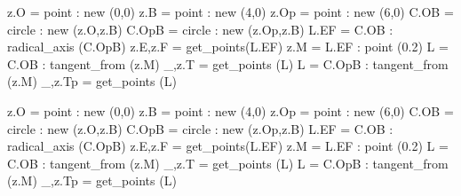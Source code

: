 \begin{tkzexample}[latex=0cm,small,code only]
   \begin{tkzelements}
   z.O      = point : new (0,0)
   z.B      = point : new (4,0)
   z.Op     = point : new (6,0)
   C.OB     = circle :    new (z.O,z.B)
   C.OpB    = circle :    new (z.Op,z.B)
   L.EF     = C.OB : radical_axis (C.OpB)
   z.E,z.F  = get_points(L.EF)
   z.M      = L.EF : point (0.2)
   L        = C.OB : tangent_from (z.M)
   _,z.T    = get_points (L)
   L        = C.OpB : tangent_from (z.M)
   _,z.Tp   = get_points (L)
\end{tkzelements}
\end{tkzexample}

\begin{tkzelements}
z.O      = point : new (0,0)
z.B      = point : new (4,0)
z.Op     = point : new (6,0)
C.OB     = circle :    new (z.O,z.B)
C.OpB    = circle :    new (z.Op,z.B)
L.EF     = C.OB : radical_axis (C.OpB)
z.E,z.F  = get_points(L.EF)
z.M      = L.EF : point (0.2)
L        = C.OB : tangent_from (z.M)
_,z.T    = get_points (L)
L        = C.OpB : tangent_from (z.M)
_,z.Tp   = get_points (L)
\end{tkzelements}
\hspace*{\fill}  
\hspace*{\fill}

